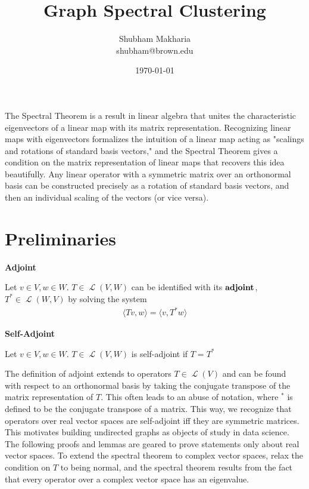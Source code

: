 \documentclass[letterpaper,12pt]{article}
\newcommand{\langlerangle}[1]{\langle{#1}\rangle}
\newcommand{\linearoperator}[1]{\operatorname{\mathcal{L}}(#1)}
\begin{document}
\title{Graph Spectral Clustering}
\author{Shubham Makharia \\shubham@brown.edu}
\date{\today}
\maketitle
The Spectral Theorem is a result in linear algebra that unites the characteristic eigenvectors of a linear map with its matrix representation. Recognizing linear maps with eigenvectors formalizes the intuition of a linear map acting as "scalings and rotations of standard basis vectors," and the Spectral Theorem gives a condition on the matrix representation of linear maps that recovers this idea beautifully. Any linear operator with a symmetric matrix over an orthonormal basis can be constructed precisely as a rotation of standard basis vectors, and then an individual scaling of the vectors (or vice versa). 

\section{Preliminaries}

\noindent
\textbf{Adjoint}

\noindent
Let $v \in V, w \in W$. $T \in \linearoperator{V,W}$ can be identified with its $\bf{adjoint}$, $T^* \in \linearoperator{W,V}$ by solving the system
\begin{align*}
    \langlerangle{Tv,w}=\langlerangle{v,T^{*}w}
\end{align*}

\noindent
\textbf{Self-Adjoint}

\noindent
Let $v \in V, w \in W$. $T \in \linearoperator{V,W}$ is self-adjoint if $ T=T^*$


\noindent The definition of adjoint extends to operators $T \in \linearoperator{V}$ and can be found with respect to an orthonormal basis by taking the conjugate transpose of the matrix representation of $T$. This often leads to an abuse of notation, where $^{*}$ is defined to be the conjugate transpose of a matrix. This way, we recognize that operators over real vector spaces are self-adjoint iff they are symmetric matrices. This motivates building undirected graphs as objects of study in data science. The following proofs and lemmas are geared to prove statements only about real vector spaces. To extend the spectral theorem to complex vector spaces, relax the condition on $T$ to being normal, and the spectral theorem results from the fact that every operator over a complex vector space has an eigenvalue.
\end{document}

